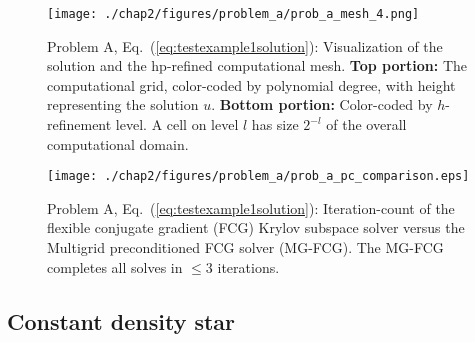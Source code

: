 
\begin{figure}
  \texttt{[image: ./chap2/figures/problem\_a/prob\_a\_mesh\_4.png]}
  
  \caption{ \label{fig:test_example_1_mesh} Problem A,
    Eq.~(\ref{eq:testexample1solution}): Visualization of the
      solution and the hp-refined computational mesh.  {\bf Top
        portion:} The computational grid, color-coded by polynomial
      degree, with height representing the solution $u$.  {\bf Bottom
        portion:} Color-coded by $h$-refinement level.  A cell on
      level $l$ has size $2^{-l}$ of the overall computational
      domain.}
\end{figure}


\begin{figure}
  \centering
  \texttt{[image: ./chap2/figures/problem\_a/prob\_a\_pc\_comparison.eps]}
  \caption{Problem A, Eq.~(\ref{eq:testexample1solution}): Iteration-count of the flexible conjugate gradient (FCG) Krylov subspace solver versus the Multigrid preconditioned FCG solver (MG-FCG). The MG-FCG completes all solves in $\leq 3$ iterations.}
  \label{fig:mgfcg_vs_fcg}
\end{figure}

\subsection{Constant density star}

